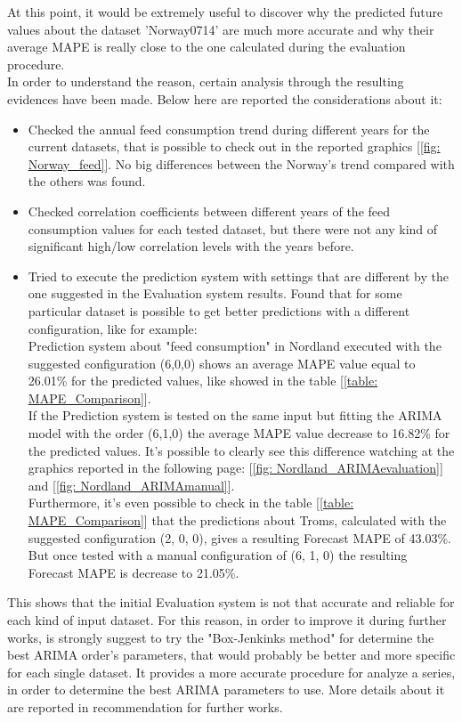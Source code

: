 At this point, it would be extremely useful to discover why the predicted future values about the dataset 'Norway0714' are much more accurate and why their average MAPE is really close to the one calculated during the evaluation procedure.\\
In order to understand the reason, certain analysis through the resulting evidences have been made. Below here are reported the considerations about it:
\vspace{-5mm}
\begin{itemize}
 \item Checked the annual feed consumption trend during different years for the current datasets, that is possible to check out in the reported graphics [\ref{fig: Norway_feed}]. No big differences between the Norway's trend compared with the others was found.
 \item Checked correlation coefficients between different years of the feed consumption values for each tested dataset, but there were not any kind of significant high/low correlation levels with the years before.
 \item Tried to execute the prediction system with settings that are different by the one suggested in the Evaluation system results. Found that for some particular dataset is possible to get better predictions with a different configuration, like for example: \\
 Prediction system about "feed consumption" in Nordland executed with the suggested configuration (6,0,0) shows an average MAPE value equal to 26.01\% for the predicted values, like showed in the table [\ref{table: MAPE_Comparison}]. \\
If the Prediction system is tested on the same input but fitting the ARIMA model with the order (6,1,0) the average MAPE value decrease to 16.82\% for the predicted values. It's possible to clearly see this difference watching at the graphics reported in the following page: [\ref{fig: Nordland_ARIMAevaluation}] and [\ref{fig: Nordland_ARIMAmanual}]. \\ 
Furthermore, it's even possible to check in the table [\ref{table: MAPE_Comparison}] that the predictions about Troms, calculated with the suggested configuration (2, 0, 0),  gives a resulting Forecast MAPE of 43.03\%. But once tested with a manual configuration of (6, 1, 0) the resulting Forecast MAPE is decrease to 21.05\%.
\end{itemize}

This shows that the initial Evaluation system is not that accurate and reliable for each kind of input dataset. For this reason, in order to improve it during further works, is strongly suggest to try the "Box-Jenkinks method" for determine the best ARIMA order's parameters, that would probably be better and more specific for each single dataset. It provides a more accurate procedure for analyze a series, in order to determine the best ARIMA parameters to use. More details about it are reported in recommendation for further works.


